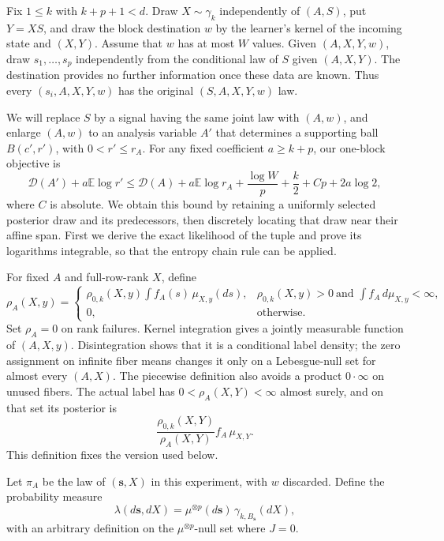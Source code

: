 Fix \(1\le k\) with \(k+p+1<d\).  Draw \(X\sim\gamma_k\)
independently of \((A,S)\), put \(Y=XS\), and draw the block destination
\(w\) by the learner's kernel of the incoming state and \((X,Y)\).
Assume that \(w\) has at most \(W\) values.  Given \((A,X,Y,w)\), draw
\(s_1,\ldots,s_p\) independently from the conditional law of \(S\)
given \((A,X,Y)\).  The destination provides no further information
once these data are known.  Thus every \((s_i,A,X,Y,w)\) has the
original \((S,A,X,Y,w)\) law.

We will replace \(S\) by a signal having the same joint law with
\((A,w)\), and enlarge \((A,w)\) to an analysis variable \(A'\)
that determines a supporting ball \(B(c',r')\), with
\(0<r'\le r_A\).  For any fixed coefficient \(a\ge k+p\), our
one-block objective is
\[
 \mathcal D(A')+a\mathbb E\log r'
 \le \mathcal D(A)+a\mathbb E\log r_A
       +\frac{\log W}{p}+\frac{k}{2}+Cp+2a\log2,
\]
where \(C\) is absolute.  We obtain this bound by retaining a
uniformly selected posterior draw and its predecessors, then
discretely locating that draw near their affine span.  First we
derive the exact likelihood of the tuple and prove its logarithms
integrable, so that the entropy chain rule can be applied.

For fixed \(A\) and full-row-rank \(X\), define
\[
 \rho_A(X,y)=
 \begin{cases}
 \displaystyle \rho_{0,k}(X,y)\int f_A(s)\,\mu_{X,y}(ds),
 &\rho_{0,k}(X,y)>0\ \text{and }\displaystyle\int f_A\,d\mu_{X,y}<\infty,\\
 0,&\text{otherwise}.
 \end{cases}
\]
Set \(\rho_A=0\) on rank failures.  Kernel integration gives a
jointly measurable function of
\((A,X,y)\).  Disintegration shows that it is a conditional label
density; the zero assignment on infinite fiber means changes it
only on a Lebesgue-null set for almost every \((A,X)\).  The
piecewise definition also avoids a product \(0\cdot\infty\) on
unused fibers.  The actual label has \(0<\rho_A(X,Y)<\infty\)
almost surely, and on that set its posterior is
\[
 \frac{\rho_{0,k}(X,Y)}{\rho_A(X,Y)}f_A\,\mu_{X,Y}.
\]
This definition fixes the version used below.

Let \(\pi_A\) be the law of \((\mathbf s,X)\) in this experiment,
with \(w\) discarded.  Define the probability measure
\[
 \lambda(d\mathbf s,dX)
   =\mu^{\otimes p}(d\mathbf s)\,
      \gamma_{k,B_{\mathbf s}}(dX),
\]
with an arbitrary definition on the \(\mu^{\otimes p}\)-null set
where \(J=0\).

